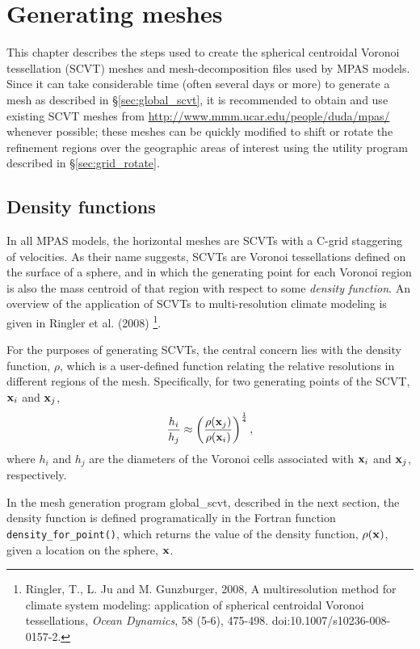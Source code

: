 \chapter{Generating meshes}
\label{chap:mpas_grid_generation}

This chapter describes the steps used to create the  spherical centroidal Voronoi tessellation (SCVT) meshes and mesh-decomposition files used by MPAS models.
Since it can take considerable time (often several days or more) to generate a mesh as described in \S \ref{sec:global_scvt}, it is recommended to obtain 
and use existing SCVT meshes from \url{http://www.mmm.ucar.edu/people/duda/mpas/} whenever possible; these meshes can be quickly
modified to shift or rotate the refinement regions over the geographic areas of interest using the utility program described in \S \ref{sec:grid_rotate}.

\section{Density functions}

In all MPAS models, the horizontal meshes are SCVTs with a C-grid staggering of
velocities. As their name suggests, SCVTs are Voronoi tessellations defined on the surface of a sphere, and in which the generating 
point for each Voronoi region is also the mass centroid of that region with respect to some {\em density function}. An overview of
the application of SCVTs to multi-resolution climate modeling is given in Ringler et al. (2008)
\footnote{Ringler, T., L. Ju and M. Gunzburger, 2008, A multiresolution method for climate system modeling: application of spherical centroidal Voronoi tessellations, {\em Ocean Dynamics}, 58 (5-6), 475-498. doi:10.1007/s10236-008-0157-2.}.

For the purposes of generating SCVTs, the central concern lies with the density function, $\rho$, which is a user-defined
function relating the relative resolutions in different regions of the mesh. Specifically, for two generating points of the 
SCVT, ${\bf x}_i$ and ${\bf x}_j$,
\[
{h_i \over h_j} \approx \left({\rho({\bf x}_j) \over \rho({\bf x}_i)} \right)^{1 \over 4},
\]
where $h_i$ and $h_j$ are the diameters of the Voronoi cells associated with ${\bf x}_i$ and ${\bf x}_j$, respectively.

In the mesh generation program global\_scvt, described in the next section, the density function is defined programatically in the Fortran function
{\tt density\_for\_point()}, which returns the value of the density function, $\rho({\bf x})$, given a location on the sphere, ${\bf x}$.
   
